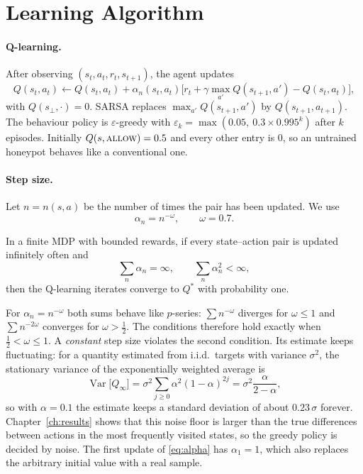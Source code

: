 \section{Learning Algorithm}
\label{sec:learning}

\paragraph{Q-learning.} After observing $(s_t, a_t, r_t, s_{t+1})$, the agent updates
\begin{equation}
Q(s_t,a_t) \leftarrow Q(s_t,a_t) + \alpha_n(s_t,a_t)\Big[r_t + \gamma \max_{a'} Q(s_{t+1},a') - Q(s_t,a_t)\Big],
\label{eq:q}
\end{equation}
with $Q(s_\bot,\cdot) = 0$. SARSA replaces $\max_{a'} Q(s_{t+1}, a')$ by $Q(s_{t+1}, a_{t+1})$.
The behaviour policy is $\varepsilon$-greedy with $\varepsilon_k = \max(0.05,\ 0.3 \times
0.995^k)$ after $k$ episodes. Initially $Q(s,\textsc{allow}) = 0.5$ and every other entry is $0$,
so an untrained honeypot behaves like a conventional one.

\paragraph{Step size.} Let $n = n(s,a)$ be the number of times the pair has been updated. We use
\begin{equation}
\alpha_n = n^{-\omega}, \qquad \omega = 0.7 .
\label{eq:alpha}
\end{equation}

\begin{proposition}
In a finite MDP with bounded rewards, if every state--action pair is updated infinitely often
and
\[
\textstyle\sum_{n} \alpha_n = \infty, \qquad \sum_{n} \alpha_n^2 < \infty,
\]
then the Q-learning iterates converge to $Q^*$ with probability one.
\end{proposition}

For $\alpha_n = n^{-\omega}$ both sums behave like $p$-series: $\sum n^{-\omega}$ diverges
for $\omega \le 1$ and $\sum n^{-2\omega}$ converges for $\omega > \tfrac12$. The conditions
therefore hold exactly when $\tfrac12 < \omega \le 1$. A \emph{constant} step size violates the
second condition. Its estimate keeps fluctuating: for a quantity estimated from i.i.d.\ targets
with variance $\sigma^2$, the stationary variance of the exponentially weighted average is
\[
\operatorname{Var}\big[Q_\infty\big] = \sigma^2 \sum_{j\ge 0} \alpha^2 (1-\alpha)^{2j}
= \sigma^2 \frac{\alpha}{2-\alpha},
\]
so with $\alpha = 0.1$ the estimate keeps a standard deviation of about $0.23\,\sigma$ forever.
Chapter~\ref{ch:results} shows that this noise floor is larger than the true differences
between actions in the most frequently visited states, so the greedy policy is decided by
noise. The first update of \eqref{eq:alpha} has $\alpha_1 = 1$, which also replaces the
arbitrary initial value with a real sample.


